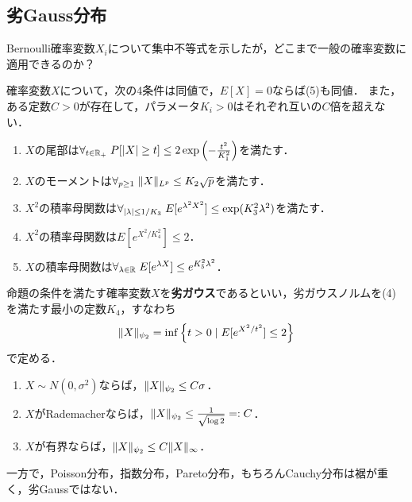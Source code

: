\documentclass[uplatex,dvipdfmx]{jsreport}
\begin{document}
\subsection{劣Gauss分布}

\begin{tcolorbox}[colframe=ForestGreen, colback=ForestGreen!10!white,breakable,colbacktitle=ForestGreen!40!white,coltitle=black,fonttitle=\bfseries\sffamily,
title=]
    Bernoulli確率変数$X_i$について集中不等式を示したが，どこまで一般の確率変数に適用できるのか？
\end{tcolorbox}

\begin{proposition}
    確率変数$X$について，次の4条件は同値で，$E[X]=0$ならば(5)も同値．
    また，ある定数$C>0$が存在して，パラメータ$K_i>0$はそれぞれ互いの$C$倍を超えない．
    \begin{enumerate}
        \item $X$の尾部は$\forall_{t\in\mathbb{R}_+}\;P[\lvert X\rvert\ge t]\le 2\exp\left(-\frac{t^2}{K_1^2}\right)$を満たす．
        \item $X$のモーメントは$\forall_{p\ge 1}\;\|X\|_{L^p}\le K_2\sqrt{p}$を満たす．
        \item $X^2$の積率母関数は$\forall_{\lvert\lambda\rvert\le1/K_3}\;E[e^{\lambda^2X^2}]\le\exp(K_3^2\lambda^2)$を満たす．
        \item $X^2$の積率母関数は$E[e^{X^2/K_4^2}]\le 2$．
        \item $X$の積率母関数は$\forall_{\lambda\in\mathbb{R}}\;E[e^{\lambda X}]\le e^{K^2_5\lambda^2}$．
    \end{enumerate}
\end{proposition}

\begin{definition}
    命題の条件を満たす確率変数$X$を\textbf{劣ガウス}であるといい，劣ガウスノルムを(4)を満たす最小の定数$K_4$，すなわち
    \[\|X\|_{\psi_2}=\inf\left\{t>0\mid E[e^{X^2/t^2}]\le 2\right\}\]
    で定める．
\end{definition}

\begin{example}\mbox{}
    \begin{enumerate}
        \item $X\sim N(0,\sigma^2)$ならば，$\|X\|_{\psi_2}\le C\sigma$．
        \item $X$がRademacherならば，$\|X\|_{\psi_2}\le\frac{1}{\sqrt{\log 2}}=:C$．
        \item $X$が有界ならば，$\|X\|_{\psi_2}\le C\|X\|_\infty$．
    \end{enumerate}
    一方で，Poisson分布，指数分布，Pareto分布，もちろんCauchy分布は裾が重く，劣Gaussではない．
\end{example}
\end{document}
